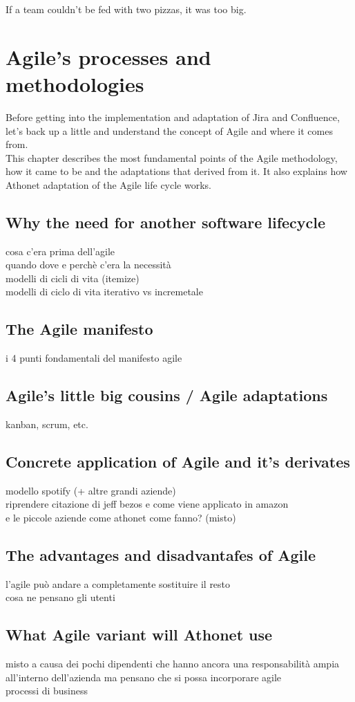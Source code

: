 \begin{savequote}[75mm]
If a team couldn’t be fed with two pizzas, it was too big.
\end{savequote}

\chapter{Agile's processes and methodologies}

Before getting into the implementation and adaptation of Jira and Confluence, let's back up a little and understand the concept of Agile and where it comes from.\\
This chapter describes the most fundamental points of the Agile methodology, how it came to be and the adaptations that derived from it.
It also explains how Athonet adaptation of the Agile life cycle works.

\section{Why the need for another software lifecycle}
	cosa c'era prima dell'agile\\
	quando dove e perchè c'era la necessità\\
	modelli di cicli di vita (itemize)\\
	modelli di ciclo di vita iterativo vs incremetale

\section{The Agile manifesto}
	i 4 punti fondamentali del manifesto agile

\section{Agile's little big cousins / Agile adaptations}
	kanban, scrum, etc.

\section{Concrete application of Agile and it's derivates}
	modello spotify (+ altre grandi aziende)\\
	riprendere citazione di jeff bezos e come viene applicato in amazon\\
	e le piccole aziende come athonet come fanno? (misto)

\section{The advantages and disadvantafes of Agile}
	l'agile può andare a completamente sostituire il resto\\
	cosa ne pensano gli utenti

\section{What Agile variant will Athonet use}
	misto a causa dei pochi dipendenti che hanno ancora una responsabilità ampia all'interno dell'azienda ma pensano che si possa incorporare agile\\
	processi di business

